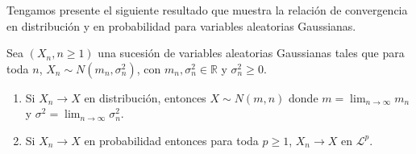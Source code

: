 Tengamos presente el siguiente resultado que muestra la relación de convergencia en distribución y en probabilidad para variables aleatorias Gaussianas.

\begin{theorem}
Sea $(X_n, n \geq 1)$ una sucesión de variables aleatorias Gaussianas tales que para toda $n$, $X_n \sim N(m_n, \sigma_n^2)$, con $m_n, \sigma_n^2 \in \mathbb{R}$ y $\sigma_n^2 \geq 0$.
	\begin{enumerate}
	\item Si $X_n \rightarrow X$ en distribución, entonces $X \sim N(m, n)$ donde $m = \lim_{n \rightarrow \infty} m_n$ y $\sigma^2 = \lim_{n \rightarrow \infty} \sigma_n^2$.
	\item Si $X_n \rightarrow X$ en probabilidad entonces para toda $p \geq 1$, $X_n \rightarrow X$ en $\mathcal{L}^p$.
	\end{enumerate}
\end{theorem}

